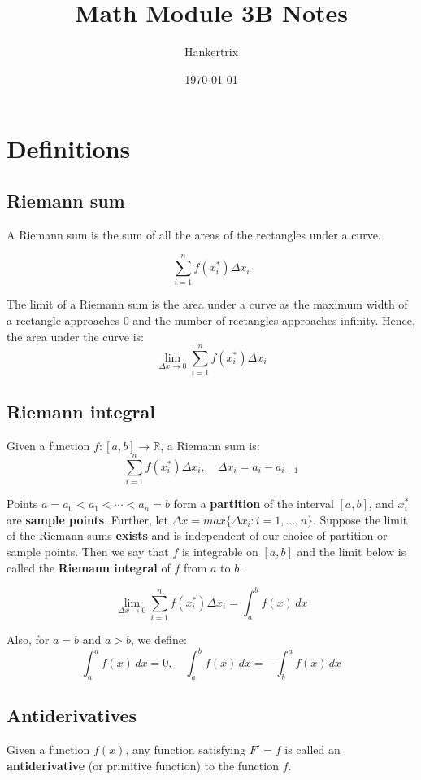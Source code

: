 \documentclass[11pt]{article}
\author{Hankertrix}
\date{\today}
\title{Math Module 3B Notes}
\begin{document}
\maketitle
\setcounter{tocdepth}{2}
\tableofcontents \clearpage\section{Definitions}
\label{sec:org5d33de0}

\subsection{Riemann sum}
\label{sec:orgb1d2701}
A Riemann sum is the sum of all the areas of the rectangles under a curve.

\[\sum_{i = 1}^n f(x_{i}^*) \Delta x_i\]

The limit of a Riemann sum is the area under a curve as the maximum width of a rectangle approaches 0 and the number of rectangles approaches infinity. Hence, the area under the curve is:
\[\lim_{\Delta x \rightarrow 0} \sum_{i = 1}^n f(x_i^*) \Delta x_i\]
\subsection{Riemann integral}
\label{sec:orge60a177}
Given a function \(f : [a, b] \rightarrow \mathbb{R}\), a Riemann sum is:
\[\sum_{i = 1}^n f(x_i^*) \Delta x_i, \quad \Delta x_i = a_i - a_{i - 1}\]

Points \(a = a_0 < a_1 < \cdots < a_n = b\) form a \textbf{partition} of the interval \([a, b]\), and \(x_i^*\) are \textbf{sample points}. Further, let \(\Delta x = max\{\Delta x_i : i = 1, \ldots, n\}\). Suppose the limit of the Riemann sums \textbf{exists} and is independent of our choice of partition or sample points. Then we say that \(f\) is integrable on \([a, b]\) and the limit below is called the \textbf{Riemann integral} of \(f\) from \(a\) to \(b\).

\[\lim_{\Delta x \rightarrow 0} \sum_{i = 1}^n f(x_i^*) \Delta x_i = \int_a^b f(x) \, dx\]

Also, for \(a = b\) and \(a > b\), we define:
\[\int_a^a f(x) \, dx = 0, \quad \int_a^b f(x) \, dx = - \int_b^a f(x) \, dx\]

\newpage
\subsection{Antiderivatives}
\label{sec:org9d1a226}
Given a function \(f(x)\), any function satisfying \(F' = f\) is called an \textbf{antiderivative} (or primitive function) to the function \(f\).
\end{document}
